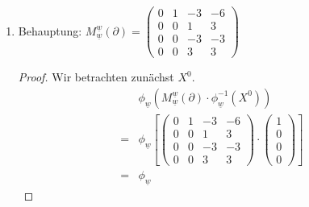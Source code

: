 \documentclass{article}
\begin{document}
\begin{enumerate}[(a)]
\begin{enumerate}[1.)]
\begin{proof}
\begin{align*}
\begin{pmatrix}
                        0 & 0 & 0 & 0
                    \end{pmatrix} \cdot 
                    \begin{pmatrix}0 \\ 0 \\ 0 \\ 1\end{pmatrix}
                    \right]\\
                =&\phi_{\underline{v}}
                    \left[\begin{pmatrix}0 \\ 0 \\ 3 \\ 0\end{pmatrix}\right]
                    = 3X^2 = \partial(X^3)
            \end{align*} 
        \end{proof}
        \item Behauptung: $M_{\underline{w}}^{\underline{w}} (\partial) = 
        \begin{pmatrix}
            0 & 1 & -3 & -6\\
            0 & 0 & 1 & 3\\
            0 & 0 & -3 & -3\\
            0 & 0 & 3 & 3
        \end{pmatrix}$
        \begin{proof}
            Wir betrachten zunächst $X^0$.
            \begin{align*}
                &\phi_{\underline{w}}(M_{\underline{w}}^{\underline{w}} (\partial) \cdot \phi_{\underline{w}}^{-1}(X^0))\\
                =&\phi_{\underline{w}}
                    \left[
                    \begin{pmatrix}
                        0 & 1 & -3 & -6\\
                        0 & 0 & 1 & 3\\
                        0 & 0 & -3 & -3\\
                        0 & 0 & 3 & 3
                    \end{pmatrix} \cdot 
                    \begin{pmatrix}1 \\ 0 \\ 0 \\ 0\end{pmatrix}
                    \right]\\
                =&\phi_{\underline{w}}

\end{align*}
\end{proof}
\end{enumerate}
\end{enumerate}
\end{document}
